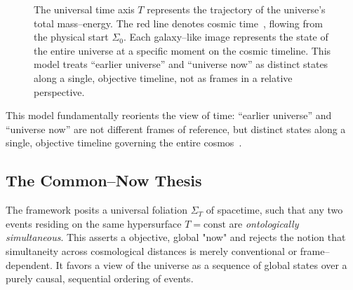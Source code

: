 \documentclass[12pt]{article}
\theoremstyle{plain}
\begin{document}
\begin{figure}[h]
    \caption{The universal time axis $T$ represents the trajectory of the universe's total mass–energy. The red line denotes cosmic time~\cite{Minkowski1908}, flowing from the physical start $\Sigma_0$. Each galaxy–like image represents the state of the entire universe at a specific moment on the cosmic timeline. This model treats ``earlier universe'' and ``universe now'' as distinct states along a single, objective timeline, not as frames in a relative perspective.}
    \label{fig:t–axis}
\end{figure}

\noindent This model fundamentally reorients the view of time: “earlier universe” and “universe now” are not different frames of reference, but distinct states along a single, objective timeline governing the entire cosmos~\cite{Mermin1984}.

\subsection{The Common–Now Thesis}
\label{sec:simultaneity}
The framework posits a universal foliation ${\Sigma_T}$ of spacetime, such that any two events residing on the same hypersurface $T = \text{const}$ are \emph{ontologically simultaneous}. This asserts a objective, global "now" and rejects the notion that simultaneity across cosmological distances is merely conventional or frame–dependent. It favors a view of the universe as a sequence of global states over a purely causal, sequential ordering of events.
\end{document}
